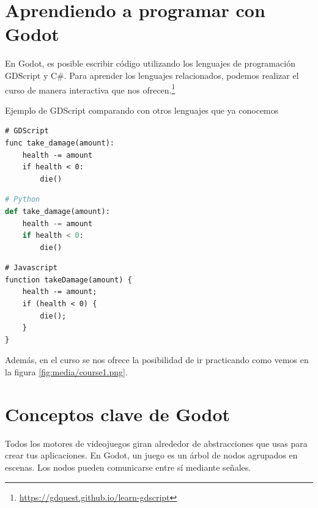 \documentclass[12pt]{report} %
\begin{document}
\hypertarget{aprendiendo-a-programar-con-godot}{%
\section{Aprendiendo a programar con
Godot}\label{aprendiendo-a-programar-con-godot}}

En Godot, es posible escribir código utilizando los lenguajes de
programación GDScript y C\#. Para aprender los lenguajes relacionados,
podemos realizar el curso de manera interactiva que nos
ofrecen.\footnote{\url{https://gdquest.github.io/learn-gdscript}}

Ejemplo de GDScript comparando con otros lenguajes que ya conocemos

\begin{lstlisting}
# GDScript
func take_damage(amount):
    health -= amount
    if health < 0:
        die()
\end{lstlisting}

\begin{lstlisting}[language=Python]
# Python
def take_damage(amount):
    health -= amount
    if health < 0:
        die()
\end{lstlisting}

\begin{lstlisting}
# Javascript
function takeDamage(amount) {
    health -= amount;
    if (health < 0) {
        die();
    }
}
\end{lstlisting}

Además, en el curso se nos ofrece la posibilidad de ir practicando como
vemos en la figura \ref{fig:media/course1.png}.


\hypertarget{conceptos-clave-de-godot}{%
\section{Conceptos clave de Godot}\label{conceptos-clave-de-godot}}

Todos los motores de videojuegos giran alrededor de abstracciones que
usas para crear tus aplicaciones. En Godot, un juego es un árbol de
nodos agrupados en escenas. Los nodos pueden comunicarse entre sí
mediante señales.
\end{document}
